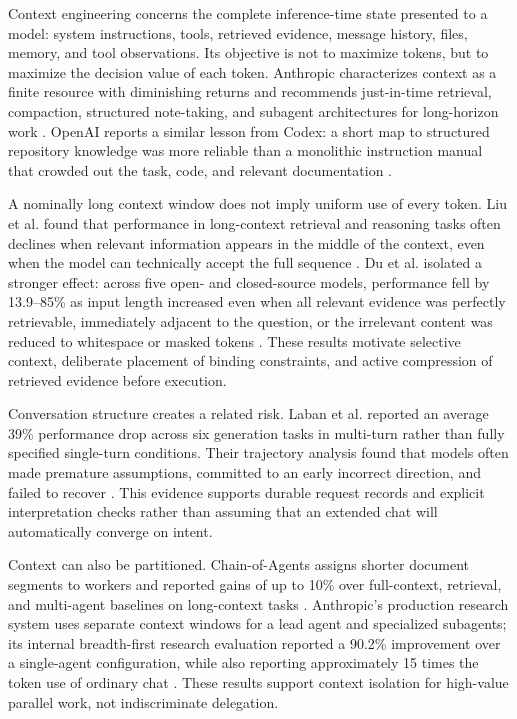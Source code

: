 \documentclass[11pt,a4paper]{article}
\begin{document}
Context engineering concerns the complete inference-time state presented to a model: system instructions, tools, retrieved evidence, message history, files, memory, and tool observations. Its objective is not to maximize tokens, but to maximize the decision value of each token. Anthropic characterizes context as a finite resource with diminishing returns and recommends just-in-time retrieval, compaction, structured note-taking, and subagent architectures for long-horizon work \cite{anthropiccontext2025}. OpenAI reports a similar lesson from Codex: a short map to structured repository knowledge was more reliable than a monolithic instruction manual that crowded out the task, code, and relevant documentation \cite{openaiharness2026}.

A nominally long context window does not imply uniform use of every token. Liu et al. found that performance in long-context retrieval and reasoning tasks often declines when relevant information appears in the middle of the context, even when the model can technically accept the full sequence \cite{liu2024}. Du et al. isolated a stronger effect: across five open- and closed-source models, performance fell by 13.9--85\% as input length increased even when all relevant evidence was perfectly retrievable, immediately adjacent to the question, or the irrelevant content was reduced to whitespace or masked tokens \cite{du2025context}. These results motivate selective context, deliberate placement of binding constraints, and active compression of retrieved evidence before execution.

Conversation structure creates a related risk. Laban et al. reported an average 39\% performance drop across six generation tasks in multi-turn rather than fully specified single-turn conditions. Their trajectory analysis found that models often made premature assumptions, committed to an early incorrect direction, and failed to recover \cite{laban2025multiturn}. This evidence supports durable request records and explicit interpretation checks rather than assuming that an extended chat will automatically converge on intent.

Context can also be partitioned. Chain-of-Agents assigns shorter document segments to workers and reported gains of up to 10\% over full-context, retrieval, and multi-agent baselines on long-context tasks \cite{zhang2024chainagents}. Anthropic's production research system uses separate context windows for a lead agent and specialized subagents; its internal breadth-first research evaluation reported a 90.2\% improvement over a single-agent configuration, while also reporting approximately 15 times the token use of ordinary chat \cite{anthropicmultiagent2025}. These results support context isolation for high-value parallel work, not indiscriminate delegation.
\end{document}
